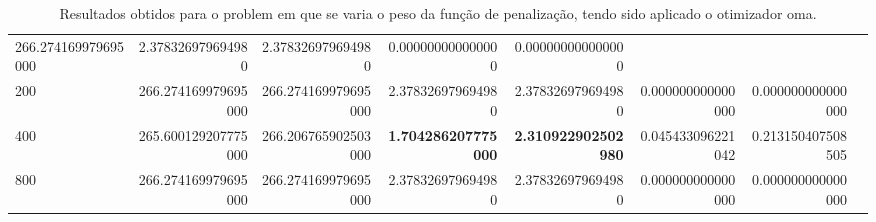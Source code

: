 \begin{table}[!ht]
{\begin{tabular}{lrrrrrrr}
            266.274169979695000                            &
            2.378326979694980                              &
            2.378326979694980                              &
            0.000000000000000                              &
            0.000000000000000
            \\
            200                                            &
            266.274169979695000                            &
            266.274169979695000                            &
            2.378326979694980                              &
            2.378326979694980                              &
            0.000000000000000                              &
            0.000000000000000
            \\
            400                                            &
            265.600129207775000                            &
            266.206765902503000                            &
            \textbf{1.704286207775000}                     &
            \textbf{2.310922902502980}                     &
            0.045433096221042                              &
            0.213150407508505
            \\
            800                                            &
            266.274169979695000                            &
            266.274169979695000                            &
            2.378326979694980                              &
            2.378326979694980                              &
            0.000000000000000                              &
            0.000000000000000
            \\ \toprule
        \end{tabular}%
    }
    \caption{Resultados obtidos para o \gls{problem} em que se varia o peso da função de penalização, tendo sido aplicado o otimizador \gls{oma}.
    }%
    \label{tab:resultados-memetico}
\end{table}